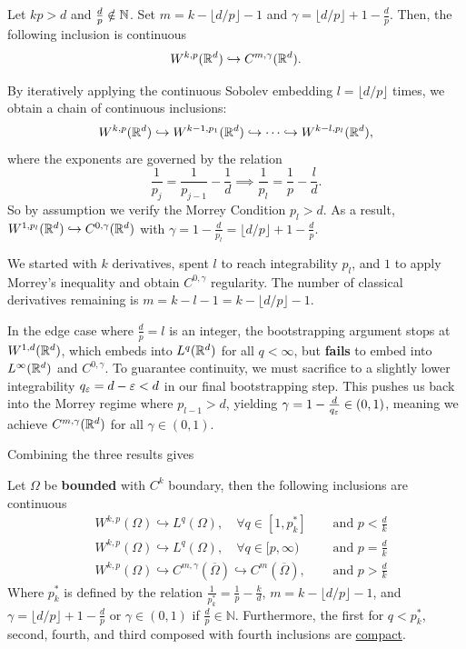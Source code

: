 \documentclass[
    a4paper,
    DIV=14,
    abstract=true,
    numbers=noenddot
]{scrartcl}
\begin{document}
\begin{exercise}\label{est32}
	Let $kp>d$ and $\frac{d}{p} \notin \mathbb{N}$. Set $m = k - \lfloor d/p \rfloor - 1$ and $\gamma = \lfloor d/p \rfloor + 1 -\frac{d}{p}$. Then, the following inclusion is continuous
	\begin{align*}
		W^{k,p}(\mathbb{R}^d) \hookrightarrow C^{m,\gamma }(\mathbb{R}^d).
	\end{align*}
\end{exercise}
\begin{hint}
By iteratively applying the continuous Sobolev embedding $l=\lfloor d/p \rfloor$ times, we obtain a chain of continuous inclusions:
	$$W^{k,p}(\mathbb{R}^d) \hookrightarrow W^{k-1, p_1}(\mathbb{R}^d) \hookrightarrow \dots \hookrightarrow W^{k-l, p_l}(\mathbb{R}^d),$$
	where the exponents are governed by the relation $$\frac{1}{p_j} = \frac{1}{p_{j-1}} - \frac{1}{d} \implies \frac{1}{p_l} = \frac{1}{p} - \frac{l}{d}.$$
So by assumption we verify the	Morrey Condition $p_l > d$. As a result, $W^{1, p_l}(\mathbb{R}^d) \hookrightarrow C^{0, \gamma}(\mathbb{R}^d)$ with $\gamma = 1 - \frac{d}{p_l} = \lfloor d/p \rfloor + 1 - \frac{d}{p}$.
	
We started with $k$ derivatives, spent $l$ to reach integrability $p_l$, and $1$ to apply Morrey's inequality and obtain $C^{0, \gamma}$ regularity. The number of classical derivatives remaining is $m = k - l - 1 = k - \lfloor d/p \rfloor - 1$.
	
In the edge case where $\frac{d}{p} = l$ is an integer, the bootstrapping argument stops at $W^{1,d}(\mathbb{R}^d)$, which embeds into $L^q(\mathbb{R}^d)$ for all $q<\infty$, but \textbf{fails} to embed into $L^\infty(\mathbb{R}^d)$ and $C^{0,\gamma}$. To guarantee continuity, we must sacrifice to a slightly lower integrability $q_\varepsilon = d-\varepsilon < d$ in our final bootstrapping step. This pushes us back into the Morrey regime where $p_{l-1} > d$, yielding $\gamma = 1 - \frac{d}{q_\varepsilon} \in (0,1)$, meaning we achieve $C^{m, \gamma}(\mathbb{R}^d)$ for all $\gamma \in (0,1)$.
\end{hint}
Combining the three results gives
\begin{theorem}\label{rellich}
	Let $\Omega$ be \textbf{bounded} with $C^k$ boundary, then the following  inclusions are continuous
	\begin{align*}
		 & W^{k,p}(\Omega) \hookrightarrow L^q(\Omega) ,           \quad\forall q \in [1,p_k^*]                              & \text{ and }     p<\frac{d}{k} \\
		 & W^{k,p}(\Omega) \hookrightarrow L^q(\Omega) ,           \quad\forall q \in [p,\infty)                              & \text{ and }   p=\frac{d}{k}   \\
		 & W^{k,p}(\Omega) \hookrightarrow C^{m,\gamma }(\overline{\Omega}) \hookrightarrow C^{m}(\overline{\Omega}) ,  \quad & \text{ and }  p>\frac{d}{k}\end{align*}
	Where $p_k^*$ is defined by the relation $\frac{1}{p_k^*}=\frac{1}{p}-\frac{k}{d}$, $m = k - \lfloor d/p \rfloor - 1$, and $\gamma = \lfloor d/p \rfloor + 1 -\frac{d}{p}$ or $\gamma \in (0,1)$ if $\frac{d}{p} \in \mathbb{N}$. Furthermore, the first for $q<p_k^*$, second, fourth, and third composed with fourth inclusions are \href{https://en.wikipedia.org/wiki/Compact_embedding}{compact}.
\end{theorem}
\end{document}
